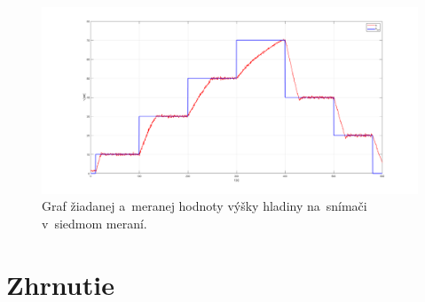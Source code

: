 \documentclass{article}
\begin{document}
\begin{figure}[!htbp]
	\begin{center}
		\includegraphics[width=\textwidth]{./include/meranie7.png}
	\end{center}
	\caption{Graf žiadanej a~meranej hodnoty výšky hladiny na~snímači v~siedmom meraní.}
	\label{fig:m7}
\end{figure}


\clearpage

\section{Zhrnutie}
\label{sec:zhrnutie}

\end{document}
